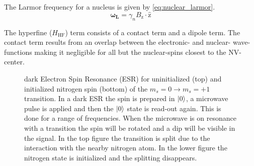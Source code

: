 The Larmor frequency for a nucleus is given by  \cref{eq:nuclear_larmor}.
\begin{equation}
\label{eq:nuclear_larmor}
\bm{\omega_L} = \gamma_{n}B_\mathrm{z} \cdot\bm{\hat{\mathrm{z}}}
\end{equation}

The hyperfine ($H_{\mathrm{HF}}$) term consists of a contact term and a dipole term.
The contact term results from an overlap between the electronic- and nuclear- wave-functions making it negligible for all but the nuclear-spins closest to the NV-center.

\begin{figure}[htbp]
\centering
    \caption{dark Electron Spin Resonance (ESR) for uninitialized (top) and initialized nitrogen spin (bottom) of the $m_s =0 \rightarrow m_s = +1$ transition. In a dark ESR the spin is prepared in ${\left\vert{0}\right\rangle}$, a microwave pulse is applied and then the ${\left\vert{0}\right\rangle}$ state is read-out again. This is done for a range of frequencies. When the microwave is on resonance with a transition the spin will be rotated and a dip will be visible in the signal. In the top figure the transition is split due to the interaction with the nearby nitrogen atom. In the lower figure the nitrogen state is initialized and the splitting disappears.}
    \label{fig:HF_split_levels}
\end{figure}

